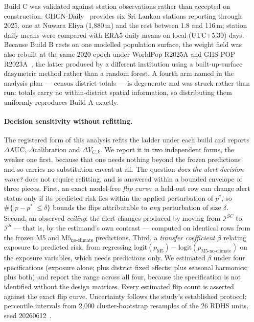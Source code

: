 \documentclass[11pt,a4paper]{article}
\begin{document}
Build C was validated against station observations rather than accepted on construction. GHCN-Daily~\cite{Menne2012} provides six Sri Lankan stations reporting through 2025, one at Nuwara Eliya (1{,}880\,m) and the rest between 1.8 and 116\,m; station daily means were compared with ERA5 daily means on local (UTC+5:30) days. Because Build B rests on one modelled population surface, the weight field was also rebuilt at the same 2020 epoch under WorldPop R2025A and GHS-POP R2023A~\cite{Schiavina2023}, the latter produced by a different institution using a built-up-surface dasymetric method rather than a random forest. A fourth arm named in the analysis plan --- census district totals --- is degenerate and was struck rather than run: totals carry no within-district spatial information, so distributing them uniformly reproduces Build A exactly.

\paragraph{Decision sensitivity without refitting.} The registered form of this analysis refits the ladder under each build and reports $\Delta$AUC, $\Delta$calibration and $\Delta V_{C,k}$. We report it in two independent forms, the weaker one first, because that one needs nothing beyond the frozen predictions and so carries no substitution caveat at all. The question \emph{does the alert decision move?} does not require refitting, and is answered within a bounded envelope of three pieces. First, an exact model-free \emph{flip curve}: a held-out row can change alert status only if its predicted risk lies within the applied perturbation of $p^*$, so $\#\{|p-p^*|\le\delta\}$ bounds the flips attributable to \emph{any} perturbation of size $\delta$. Second, an observed \emph{ceiling}: the alert changes produced by moving from $\mathcal I^{SC}$ to $\mathcal I^{S}$ --- that is, by the estimand's own contrast --- computed on identical rows from the frozen M5 and $\text{M5}_{\text{no-climate}}$ predictions. Third, a \emph{transfer coefficient} $\beta$ relating exposure to predicted risk, from regressing $\mathrm{logit}(p_{\text{M5}})-\mathrm{logit}(p_{\text{M5-no-climate}})$ on the exposure variables, which needs predictions only. We estimated $\beta$ under four specifications (exposure alone; plus district fixed effects; plus seasonal harmonics; plus both) and report the range across all four, because the specification is not identified without the design matrices. Every estimated flip count is asserted against the exact flip curve. Uncertainty follows the study's established protocol: percentile intervals from 2{,}000 cluster-bootstrap resamples of the 26 RDHS units, seed 20260612~\cite{CameronGelbachMiller2008}.
\end{document}
